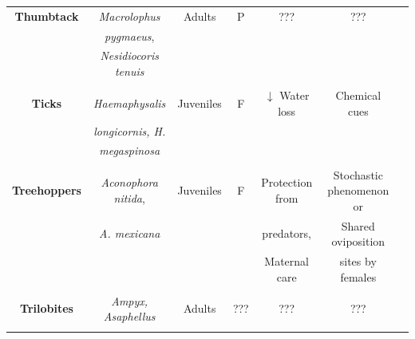 \begin{landscape}
\begin{table}
\begin{tabular*}{\linewidth}{@{\extracolsep{\fill}}ccccccc}
        \textbf{Thumbtack}	&\textit{Macrolophus}	&Adults	&P	&???	&???	&\cite{moreno-ripoll_conspecific_2012}\\
        &\textit{pygmaeus},	&	&	&	&	&\\
        &\textit{Nesidiocoris tenuis}	&	&	&	&	&\\
        &	&	&	&	&	&\\
        
        \textbf{Ticks}	&\textit{Haemaphysalis}	&Juveniles	&F	&$\downarrow$ Water loss	&Chemical cues	&\citep{sonenshine_pheromones_1985,tsunoda_interspecific_2007}\\
        &\textit{longicornis, H.}	&	&	&	&	&\\
        &\textit{megaspinosa}	&	&	&	&	&\\
        &	&	&	&	&	&\\
        
        \textbf{Treehoppers}	&\textit{Aconophora nitida},	&Juveniles	&F	&Protection from	&Stochastic phenomenon or	&\citep{olmstead_effect_1990,wood_diversity_1993}\\
        &\textit{A. mexicana}	&	&	&predators,	&Shared oviposition	&\\
        &	&	&	&Maternal care	&sites by females	&\\
        &	&	&	&	&	&\\
        
        \textbf{Trilobites}	&\textit{Ampyx, Asaphellus}	&Adults	&???	&???	&???	&\cite{rabano_linear_????}\\
        &	&	&	&	&	&\\      
             
    \end{tabular*}
    \end{table}
		
\end{landscape}     

